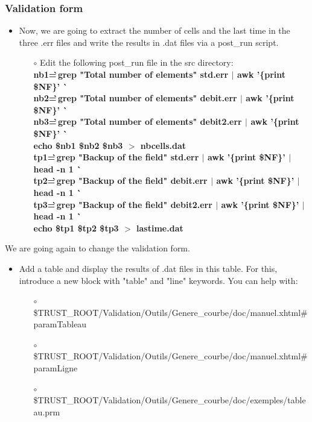 \documentclass[10pt]{beamer}
\begin{document}
\begin{frame}
\frametitle{Validation form}
\begin{block}{}

\begin{itemize}
\item Now, we are going to extract the number of cells and the last time in the three .err files and write the results in .dat files via a post\_run script.

    \begin{itemize}
    \item [$\circ$] Edit the following post\_run file in the src directory:\\
    {\footnotesize{
    \textbf{nb1=\` \,grep "Total number of elements" std.err $|$ awk '\{print \$NF\}' \`} \\
    \textbf{nb2=\` \,grep "Total number of elements" debit.err $|$ awk '\{print \$NF\}' \`} \\
    \textbf{nb3=\` \,grep "Total number of elements" debit2.err $|$ awk '\{print \$NF\}' \`} \\
    \textbf{echo \$nb1 \$nb2 \$nb3 $>$ nbcells.dat} \\
    \textbf{tp1=\` \,grep "Backup of the field" std.err $|$ awk '\{print \$NF\}' $|$ head -n 1 \`} \\
    \textbf{tp2=\` \,grep "Backup of the field" debit.err $|$ awk '\{print \$NF\}' $|$ head -n 1 \`} \\
    \textbf{tp3=\` \,grep "Backup of the field" debit2.err $|$ awk '\{print \$NF\}' $|$ head -n 1 \`} \\
    \textbf{echo \$tp1 \$tp2 \$tp3 $>$ lastime.dat} \\
    }}
    \end{itemize}
\end{itemize}

We are going again to change the validation form.

\begin{itemize}
\item Add a table and display the results of .dat files in this table. For this, introduce a new block with "table" and "line" keywords. You can help with:
    \begin{itemize}
    \item [$\circ$] {\scriptsize{\$TRUST\_ROOT/Validation/Outils/Genere\_courbe/doc/manuel.xhtml\#paramTableau}}
    \item [$\circ$] {\scriptsize{\$TRUST\_ROOT/Validation/Outils/Genere\_courbe/doc/manuel.xhtml\#paramLigne}}
    \item [$\circ$] {\scriptsize{\$TRUST\_ROOT/Validation/Outils/Genere\_courbe/doc/exemples/tableau.prm}}
    \end{itemize}
\end{itemize}

\end{block}
\end{frame}
\end{document}
